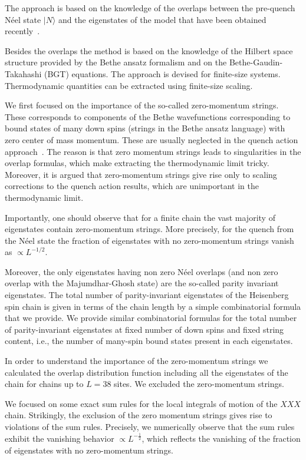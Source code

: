 \documentclass[11pt]{iopart}
\begin{document}
The approach is based on the knowledge of the 
overlaps between the pre-quench N\'eel state $|N\rangle$ and the eigenstates 
of the model that have been obtained recently~\cite{pozsgay-2014,brockmann-2014,
brockmann-2014a,brockmann-2014b,brockmann-2014c,piroli-2014}. 

Besides the overlaps the method is based on the knowledge of the Hilbert space 
structure provided by the Bethe ansatz formalism and on the Bethe-Gaudin-Takahashi 
(BGT) equations. The approach is devised for finite-size systems. Thermodynamic 
quantities can be extracted using finite-size scaling. 

We first focused on the importance of the so-called zero-momentum strings. 
These corresponds to components of the Bethe wavefunctions corresponding to 
bound states of many down spins (strings in the Bethe ansatz language) with 
zero center of mass momentum. These are usually neglected in the quench action 
approach~\cite{brockmann-2014}. The reason is that zero momentum strings 
leads to singularities in the overlap formulas, which make extracting the 
thermodynamic limit tricky. Moreover, it is argued that zero-momentum 
strings give rise only to scaling corrections to the quench action results, 
which are unimportant in the thermodynamic limit. 

Importantly, one should observe that for a finite chain the vast majority of 
eigenstates contain zero-momentum strings. More precisely, for the quench from 
the N\'eel state the fraction of eigenstates with no zero-momentum strings 
vanish as $\propto L^{-1/2}$. 

Moreover, the only eigenstates having non zero N\'eel overlaps (and non zero 
overlap with the Majumdhar-Ghosh state) are the so-called parity invariant 
eigenstates. The total number of parity-invariant eigenstates of the Heisenberg 
spin chain is given in terms of the chain length by a simple combinatorial 
formula that we provide. We provide similar combinatorial formulas for the 
total number of parity-invariant eigenstates at fixed number of down spins 
and fixed string content, i.e., the number of many-spin bound states present in 
each eigenstates. 

In order to understand the importance of the zero-momentum strings we calculated 
the overlap distribution function including all the eigenstates of the chain for 
chains up to $L=38$ sites. We excluded the zero-momentum strings. 

We focused on some exact sum rules for the local integrals of motion of the 
$XXX$ chain. Strikingly, the exclusion of the zero momentum strings gives rise 
to violations of the sum rules. Precisely, we numerically observe that the 
sum rules exhibit the vanishing behavior $\propto L^{-\frac{1}{2}}$, which 
reflects the vanishing of the fraction of eigenstates with no zero-momentum 
strings. 
\end{document}
